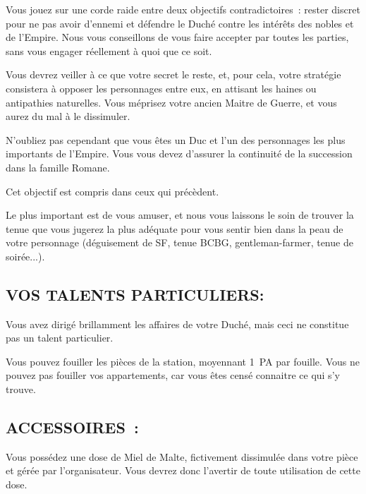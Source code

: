 \documentclass[14pt,twocolumn]{extarticle}
\begin{document}
Vous jouez sur une corde raide entre deux objectifs contradictoires~: rester
discret pour ne pas avoir d'ennemi et défendre le Duché contre les intérêts des
nobles et de l'Empire. Nous vous conseillons de vous faire accepter par toutes
les parties, sans vous engager réellement à quoi que ce soit.

Vous devrez veiller à ce que votre secret le reste, et, pour cela, votre
stratégie consistera à opposer les personnages entre eux, en attisant les
haines ou antipathies naturelles. Vous méprisez votre ancien Maitre de Guerre,
et vous aurez du mal à le dissimuler.

N'oubliez pas cependant que vous êtes un Duc et l'un des personnages les plus
importants de l'Empire. Vous vous devez d'assurer la continuité de la
succession dans la famille Romane.

Cet objectif est compris dans ceux qui précèdent.

Le plus important est de vous amuser, et nous vous laissons le soin de trouver
la tenue que vous jugerez la plus adéquate pour vous sentir bien dans la peau
de votre personnage (déguisement de SF, tenue BCBG, gentleman-farmer, tenue de
soirée...).

\subsection{VOS TALENTS PARTICULIERS:}

Vous avez dirigé brillamment les affaires de votre Duché, mais ceci ne
constitue pas un talent particulier.

Vous pouvez fouiller les pièces de la station, moyennant 1~PA par fouille. Vous
ne pouvez pas fouiller vos appartements, car vous êtes censé connaitre ce qui
s'y trouve.

\subsection{ACCESSOIRES~:}

Vous possédez une dose de Miel de Malte, fictivement dissimulée dans votre
pièce et gérée par l'organisateur. Vous devrez donc l'avertir de toute
utilisation de cette dose.
\end{document}
